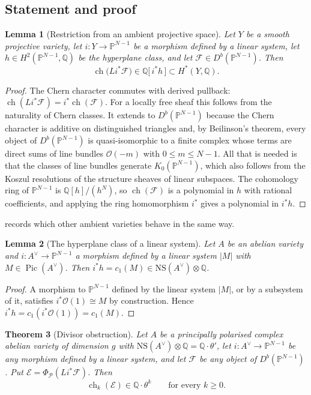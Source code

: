 \documentclass[11pt,reqno]{amsart}
\theoremstyle{plain}
\newtheorem{theorem}{Theorem}[section]
\newtheorem{lemma}[theorem]{Lemma}
\theoremstyle{definition}
\theoremstyle{remark}
\newcommand{\QQ}{\mathbb{Q}}
\newcommand{\PP}{\mathbb{P}}
\newcommand{\Av}{A^{\vee}}
\newcommand{\cP}{\mathcal{P}}
\newcommand{\cF}{\mathcal{F}}
\newcommand{\cE}{\mathcal{E}}
\newcommand{\cO}{\mathcal{O}}
\newcommand{\NS}{\mathrm{NS}}
\DeclareMathOperator{\ch}{ch}
\DeclareMathOperator{\Pic}{Pic}
\begin{document}
\subsection{Statement and proof}

\begin{lemma}[Restriction from an ambient projective space]\label{lem:ambient}
Let $Y$ be a smooth projective variety, let $i\colon Y\to\PP^{N-1}$ be a
morphism defined by a linear system, let $h\in H^{2}(\PP^{N-1},\QQ)$ be the
hyperplane class, and let $\cF\in D^{b}(\PP^{N-1})$. Then
\[
  \ch\bigl(Li^{*}\cF\bigr)\in\QQ\bigl[\,i^{*}h\,\bigr]\subset H^{*}(Y,\QQ).
\]
\end{lemma}

\begin{proof}
The Chern character commutes with derived pullback:
$\ch(Li^{*}\cF)=i^{*}\ch(\cF)$. For a locally free sheaf this follows from
the naturality of Chern classes. It extends to $D^{b}(\PP^{N-1})$ because the
Chern character is additive on distinguished triangles and, by Beilinson's
theorem, every object of $D^{b}(\PP^{N-1})$ is quasi-isomorphic to a finite
complex whose terms are direct sums of line bundles $\cO(-m)$ with
$0\le m\le N-1$. All that is needed is that the classes of line bundles
generate $K_{0}(\PP^{N-1})$, which also follows from the Koszul resolutions
of the structure sheaves of linear subspaces. The cohomology ring of
$\PP^{N-1}$ is $\QQ[h]/(h^{N})$, so $\ch(\cF)$ is a polynomial in $h$ with
rational coefficients, and applying the ring homomorphism $i^{*}$ gives a
polynomial in $i^{*}h$.
\end{proof}

\cite[Remark~2.3]{paperIII} records which other ambient varieties behave in the
same way.

\begin{lemma}[The hyperplane class of a linear system]\label{lem:hyperclass}
Let $A$ be an abelian variety and $i\colon\Av\to\PP^{N-1}$ a morphism defined
by a linear system $|M|$ with $M\in\Pic(\Av)$. Then
$i^{*}h=c_{1}(M)\in\NS(\Av)\otimes\QQ$.
\end{lemma}

\begin{proof}
A morphism to $\PP^{N-1}$ defined by the linear system $|M|$, or by a
subsystem of it, satisfies $i^{*}\cO(1)\cong M$ by construction. Hence
$i^{*}h=c_{1}(i^{*}\cO(1))=c_{1}(M)$.
\end{proof}

\begin{theorem}[Divisor obstruction]\label{thm:divisor}
Let $A$ be a principally polarised complex abelian variety of dimension $g$
with $\NS(\Av)\otimes\QQ=\QQ\cdot\theta'$, let $i\colon\Av\to\PP^{N-1}$ be any
morphism defined by a linear system, and let $\cF$ be any object of
$D^{b}(\PP^{N-1})$. Put $\cE=\Phi_{\cP}(Li^{*}\cF)$. Then
\[
  \ch_{k}(\cE)\in\QQ\cdot\theta^{k}\qquad\text{for every }k\ge0 .
\]
\end{theorem}
\end{document}
